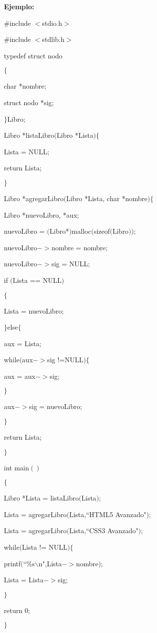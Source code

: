 \documentclass[]{article}
\begin{document}
	\textbf{Ejemplo:}
	
	\#include $<$stdio.h$>$
	
	\#include $<$stdlib.h$>$
	
	typedef struct nodo
	
	$\lbrace$
	
	char *nombre;
	
	struct nodo *sig;
	
	$\rbrace$Libro;
	
	Libro *listaLibro$($Libro *Lista$)$$\lbrace$
	
	Lista = NULL;
	
	return Lista;
	
	$\rbrace$
	
	Libro *agregarLibro$($Libro *Lista, char *nombre$)$$\lbrace$
	
	Libro *nuevoLibro, *aux;
	
	nuevoLibro = $($Libro*$)$malloc$($sizeof$($Libro$))$;
	
	nuevoLibro$->$nombre = nombre;
	
	nuevoLibro$->$sig = NULL;
	
	if $($Lista == NULL$)$
	
	$\lbrace$
	
	Lista = nuevoLibro;
	
	$\rbrace$else$\lbrace$
	
	aux = Lista;
	
	while$($aux$->$sig !=NULL$)$$\lbrace$
	
	aux = aux$->$sig;
	
	$\rbrace$
	
	aux$->$sig = nuevoLibro;
	
	$\rbrace$
	
	return Lista;
	
	$\rbrace$
	
	int main$()$
	
	$\lbrace$
	
	Libro *Lista = listaLibro$($Lista$)$;
	
	Lista = agregarLibro$($Lista,``HTML5 Avanzado"$)$;
	
	Lista = agregarLibro$($Lista,``CSS3 Avanzado"$)$;
	
	while$($Lista != NULL$)$$\lbrace$
	
	printf$($``\%s$\backslash$n",Lista$->$nombre$)$;
	
	Lista = Lista$->$sig;
	
	$\rbrace$
	
	return 0;
	
	$\rbrace$
	
\end{document}
